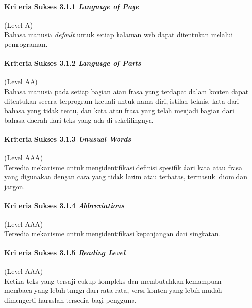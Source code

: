 \paragraph{Kriteria Sukses 3.1.1 \textit{Language of Page}}
\label{sec:kriteria_sukses_3.1.1}
(Level A)\\

Bahasa manusia \textit{default} untuk setiap halaman web dapat ditentukan melalui pemrograman.

\paragraph{Kriteria Sukses 3.1.2 \textit{Language of Parts}}
\label{sec:kriteria_sukses_3.1.2}
(Level AA)\\

Bahasa manusia pada setiap bagian atau frasa yang terdapat dalam konten dapat ditentukan secara terprogram kecuali untuk nama diri, istilah teknis, kata dari bahasa yang tidak tentu, dan kata atau frasa yang telah menjadi bagian dari bahasa daerah dari teks yang ada di sekelilingnya.

\paragraph{Kriteria Sukses 3.1.3 \textit{Unusual Words}}
\label{sec:kriteria_sukses_3.1.3}
(Level AAA)\\

Tersedia mekanisme untuk mengidentifikasi definisi spesifik dari kata atau frasa yang digunakan dengan cara yang tidak lazim atau terbatas, termasuk idiom dan jargon.

\paragraph{Kriteria Sukses 3.1.4 \textit{Abbreviations}}
\label{sec:kriteria_sukses_3.1.4}
(Level AAA)\\

Tersedia mekanisme untuk mengidentifikasi kepanjangan dari singkatan.

\paragraph{Kriteria Sukses 3.1.5 \textit{Reading Level}}
\label{sec:kriteria_sukses_3.1.5}
(Level AAA)\\

Ketika teks yang tersaji cukup kompleks dan membutuhkan kemampuan membaca yang lebih tinggi dari rata-rata, versi konten yang lebih mudah dimengerti haruslah tersedia bagi pengguna.

